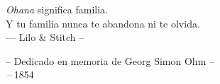 
\thispagestyle{empty}

\vspace*{3cm}


\begin{center}
\emph{Ohana} significa familia. \\
Y tu familia nunca te abandona ni te olvida.\\ \medskip
--- Lilo \& Stitch --   
\end{center}

\medskip

\begin{center}
-- Dedicado en memoria de Georg Simon Ohm -- \\ \,--\,1854
\end{center}